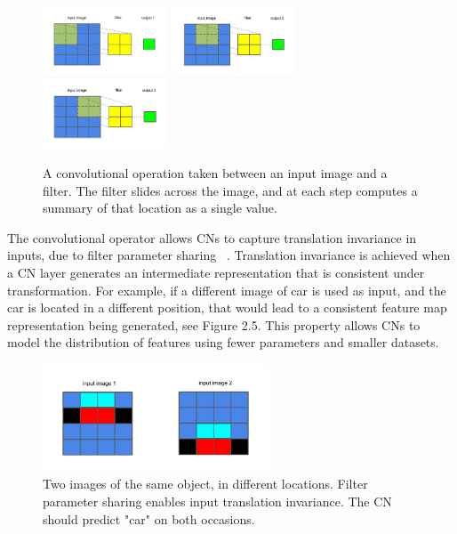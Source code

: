\begin{figure}[H]
	\centering
	\includegraphics[width=0.33\textwidth, height=0.25\textwidth]{convolution1}\hfill
	\includegraphics[width=0.33\textwidth, height=0.25\textwidth]{convolution2}\hfill
	\includegraphics[width=0.33\textwidth, height=0.25\textwidth]{convolution3}
	\captionsetup{justification=centering}
	\caption{A convolutional operation taken between an input image and a filter. The filter slides across the image, and at each step computes a summary of that location as a single value.}
\end{figure}

\noindent The convolutional operator allows CNs to capture translation invariance in inputs, due to filter parameter sharing \unskip ~\citep{simonyan2014very}. Translation invariance is achieved when a CN layer generates an intermediate representation that is consistent under transformation. For example, if a different image of  car is used as input, and the car is located in a different position, that would lead to a consistent feature map representation being generated, see Figure 2.5. This property allows CNs to model the distribution of features using fewer parameters and smaller datasets. \par 

\begin{figure}[H]
   	\centering
    	\includegraphics[width=0.6\textwidth, height=0.3\textwidth]{translation_invariance}
	\captionsetup{justification=centering}
	\caption{Two images of the same object, in different locations. Filter parameter sharing enables input translation invariance. The CN should predict "car" on both occasions.}
\end{figure}

